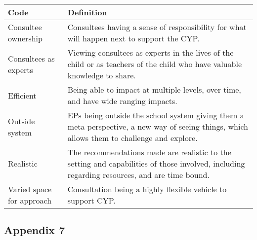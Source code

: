 \documentclass[
]{article}
\begin{document}
\begin{longtable}[]{@{}
  >{\raggedright\arraybackslash}p{}
  >{\raggedright\arraybackslash}p{}@{}}
\toprule
Code & Definition \\
\midrule
\endhead
Consultee ownership & Consultees having a sense of responsibility for
what will happen next to support the CYP. \\
Consultees as experts & Viewing consultees as experts in the lives of
the child or as teachers of the child who have valuable knowledge to
share. \\
Efficient & Being able to impact at multiple levels, over time, and have
wide ranging impacts. \\
Outside system & EPs being outside the school system giving them a meta
perspective, a new way of seeing things, which allows them to challenge
and explore. \\
Realistic & The recommendations made are realistic to the setting and
capabilities of those involved, including regarding resources, and are
time bound. \\
Varied space for approach & Consultation being a highly flexible vehicle
to support CYP. \\
\bottomrule
\end{longtable}

\hypertarget{appendix-7}{%
\subsection{Appendix 7}\label{appendix-7}}
\end{document}
